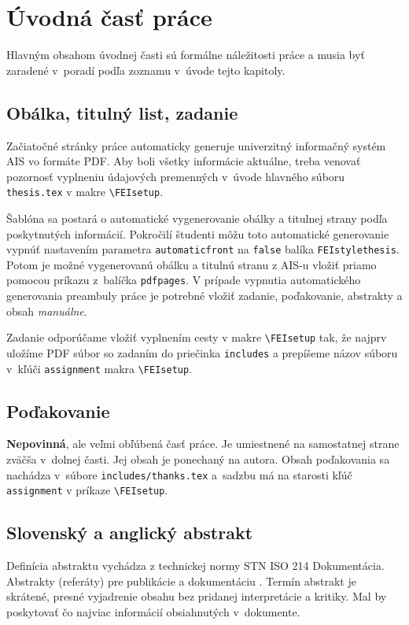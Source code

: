 \section{Úvodná časť práce}
Hlavným obsahom úvodnej časti sú formálne náležitosti práce a musia byť zaradené v~poradí podľa zoznamu v~úvode tejto kapitoly.

\subsection{Obálka, titulný list, zadanie}
Začiatočné stránky práce automaticky generuje univerzitný
informačný systém AIS vo formáte PDF.
Aby boli všetky informácie aktuálne,
treba venovať pozornosť vyplneniu údajových
premenných v~úvode hlavného súboru \verb|thesis.tex| v makre \verb|\FEIsetup|.

Šablóna sa postará o automatické vygenerovanie obálky a titulnej strany podľa
poskytnutých informácií.
Pokročilí študenti môžu toto automatické generovanie vypnúť nastavením
parametra \verb|automaticfront| na \verb|false| balíka \verb|FEIstylethesis|.
Potom je možné vygenerovanú obálku a titulnú stranu z AIS-u vložiť priamo
pomocou príkazu \verb|| z~balíčka \verb|pdfpages|.
V prípade vypnutia automatického generovania preambuly práce je potrebné vložiť
zadanie, poďakovanie, abstrakty a obsah \emph{manuálne}.

Zadanie odporúčame vložiť vyplnením cesty v makre
\verb|\FEIsetup| tak, že najprv uložíme PDF súbor
so zadaním do priečinka \verb|includes| a prepíšeme
názov súboru v~kľúči \verb|assignment| makra \verb|\FEIsetup|.

\subsection{Poďakovanie}
\textbf{Nepovinná}, ale veľmi obľúbená časť práce.
Je umiestnené na samostatnej strane zväčša v~dolnej časti.
Jej obsah je ponechaný na autora.
Obsah poďakovania sa nachádza v~súbore
\verb|includes/thanks.tex| a~sadzbu má na starosti
kľúč \verb|assignment| v príkaze \verb|\FEIsetup|.

\subsection{Slovenský a anglický abstrakt}
Definícia abstraktu vychádza z technickej normy STN ISO 214 Dokumentácia.
Abstrakty (referáty) pre publikácie a dokumentáciu \cite{iso214}.
Termín abstrakt je skrátené, presné vyjadrenie obsahu
bez pridanej interpretácie a kritiky.
Mal by poskytovať čo najviac informácií obsiahnutých v~dokumente.

